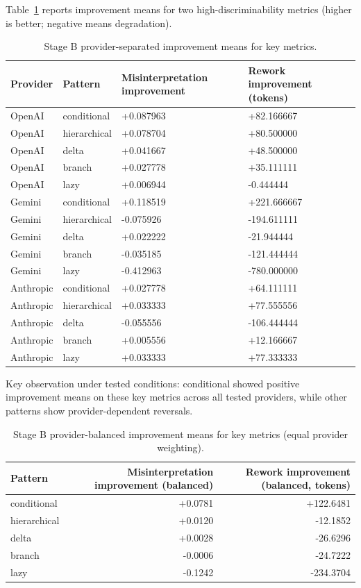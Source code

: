 \documentclass[11pt,a4paper]{article}
\begin{document}
Table~\ref{tab:stageb_key} reports improvement means for two high-discriminability metrics (higher is better; negative means degradation).

\begin{table}[h]
\centering
\small
\begin{tabular}{llll}
\toprule
Provider & Pattern & Misinterpretation improvement & Rework improvement (tokens) \\
\midrule
OpenAI & conditional & +0.087963 & +82.166667 \\
OpenAI & hierarchical & +0.078704 & +80.500000 \\
OpenAI & delta & +0.041667 & +48.500000 \\
OpenAI & branch & +0.027778 & +35.111111 \\
OpenAI & lazy & +0.006944 & -0.444444 \\
\midrule
Gemini & conditional & +0.118519 & +221.666667 \\
Gemini & hierarchical & -0.075926 & -194.611111 \\
Gemini & delta & +0.022222 & -21.944444 \\
Gemini & branch & -0.035185 & -121.444444 \\
Gemini & lazy & -0.412963 & -780.000000 \\
\midrule
Anthropic & conditional & +0.027778 & +64.111111 \\
Anthropic & hierarchical & +0.033333 & +77.555556 \\
Anthropic & delta & -0.055556 & -106.444444 \\
Anthropic & branch & +0.005556 & +12.166667 \\
Anthropic & lazy & +0.033333 & +77.333333 \\
\bottomrule
\end{tabular}
\caption{Stage B provider-separated improvement means for key metrics.}
\label{tab:stageb_key}
\end{table}

Key observation under tested conditions: conditional showed positive improvement means on these key metrics across all tested providers, while other patterns show provider-dependent reversals.

\begin{table}[h]
\centering
\small
\begin{tabular}{lrr}
\toprule
Pattern & Misinterpretation improvement (balanced) & Rework improvement (balanced, tokens) \\
\midrule
conditional & +0.0781 & +122.6481 \\
hierarchical & +0.0120 & -12.1852 \\
delta & +0.0028 & -26.6296 \\
branch & -0.0006 & -24.7222 \\
lazy & -0.1242 & -234.3704 \\
\bottomrule
\end{tabular}
\caption{Stage B provider-balanced improvement means for key metrics (equal provider weighting).}
\label{tab:stageb_key_balanced}
\end{table}
\end{document}
